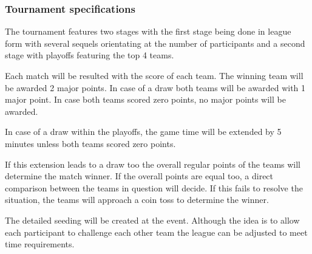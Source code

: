 \documentclass[12pt,twoside]{article}
\begin{document}
\subsubsection{Tournament specifications}

The tournament features two stages with the first stage being done in
league form with several sequels orientating at the number of
participants and a second stage with playoffs featuring the top 4
teams.

Each match will be resulted with the score of each team. The winning
team will be awarded 2 major points. In case of a draw both teams will
be awarded with 1 major point. In case both teams scored zero points,
no major points will be awarded.

In case of a draw within the playoffs, the game time will be extended
by 5 minutes unless both teams scored zero points.

If this extension leads to a draw too the overall regular points of
the teams will determine the match winner. If the overall points are
equal too, a direct comparison between the teams in question will
decide. If this fails to resolve the situation, the teams will
approach a coin toss to determine the winner.

The detailed seeding will be created at the event. Although the idea
is to allow each participant to challenge each other team the league
can be adjusted to meet time requirements.
\end{document}
